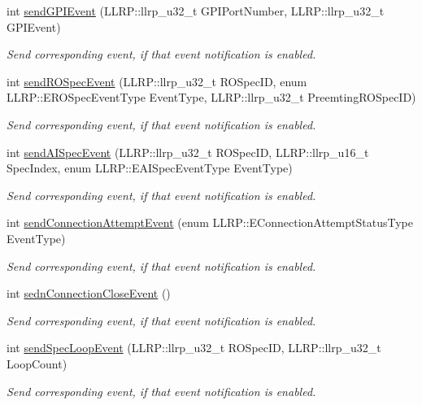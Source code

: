 \begin{DoxyCompactItemize}
\item 
int \hyperlink{class_e_l_f_i_n_1_1_event_notifier_a87bfe980b95821a36877e3943d272c84}{send\-G\-P\-I\-Event} (L\-L\-R\-P\-::llrp\-\_\-u32\-\_\-t G\-P\-I\-Port\-Number, L\-L\-R\-P\-::llrp\-\_\-u32\-\_\-t G\-P\-I\-Event)
\begin{DoxyCompactList}\small\item\em Send corresponding event, if that event notification is enabled. \end{DoxyCompactList}\item 
int \hyperlink{class_e_l_f_i_n_1_1_event_notifier_a3cf83b4e23b8c16fa587e25391dc968b}{send\-R\-O\-Spec\-Event} (L\-L\-R\-P\-::llrp\-\_\-u32\-\_\-t R\-O\-Spec\-I\-D, enum L\-L\-R\-P\-::\-E\-R\-O\-Spec\-Event\-Type Event\-Type, L\-L\-R\-P\-::llrp\-\_\-u32\-\_\-t Preemting\-R\-O\-Spec\-I\-D)
\begin{DoxyCompactList}\small\item\em Send corresponding event, if that event notification is enabled. \end{DoxyCompactList}\item 
int \hyperlink{class_e_l_f_i_n_1_1_event_notifier_a6526cc3f783409969343a5065efbf22d}{send\-A\-I\-Spec\-Event} (L\-L\-R\-P\-::llrp\-\_\-u32\-\_\-t R\-O\-Spec\-I\-D, L\-L\-R\-P\-::llrp\-\_\-u16\-\_\-t Spec\-Index, enum L\-L\-R\-P\-::\-E\-A\-I\-Spec\-Event\-Type Event\-Type)
\begin{DoxyCompactList}\small\item\em Send corresponding event, if that event notification is enabled. \end{DoxyCompactList}\item 
int \hyperlink{class_e_l_f_i_n_1_1_event_notifier_a70cc63c7ff09a5ed43e3e8315de34c4f}{send\-Connection\-Attempt\-Event} (enum L\-L\-R\-P\-::\-E\-Connection\-Attempt\-Status\-Type Event\-Type)
\begin{DoxyCompactList}\small\item\em Send corresponding event, if that event notification is enabled. \end{DoxyCompactList}\item 
int \hyperlink{class_e_l_f_i_n_1_1_event_notifier_a82b6fdfe8cf4429e4b0624a0421ddbf2}{sedn\-Connection\-Close\-Event} ()
\begin{DoxyCompactList}\small\item\em Send corresponding event, if that event notification is enabled. \end{DoxyCompactList}\item 
int \hyperlink{class_e_l_f_i_n_1_1_event_notifier_a667910f5c8ea77f2a30f989c1feaea31}{send\-Spec\-Loop\-Event} (L\-L\-R\-P\-::llrp\-\_\-u32\-\_\-t R\-O\-Spec\-I\-D, L\-L\-R\-P\-::llrp\-\_\-u32\-\_\-t Loop\-Count)
\begin{DoxyCompactList}\small\item\em Send corresponding event, if that event notification is enabled. \end{DoxyCompactList}\end{DoxyCompactItemize}

